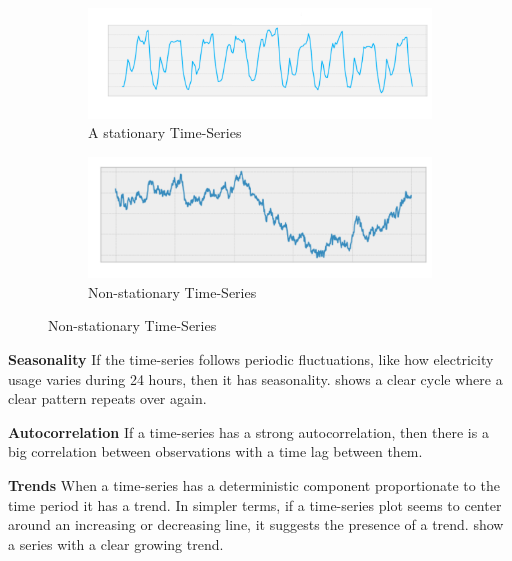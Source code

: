\begin{figure}[h!]
  \centering
  \caption{Examples of stationarity}
  \label{fig:time-series-examples-stationary-and-non-stationary}
  \begin{subfigure}[b]{0.4\textwidth}
    \includegraphics[width=\textwidth]{./figs/illustrations/time-series_example_stationary.png}
    \hfill
    \caption{A stationary Time-Series}
    \label{fig:stationary-time-series}
  \end{subfigure}
  \begin{subfigure}[b]{0.4\textwidth}
    \includegraphics[width=\textwidth]{./figs/illustrations/time-series_example_non-stationary.png}
    \hfill
    \caption{Non-stationary Time-Series}
    \label{fig:non-stationary-time-series}
  \end{subfigure}
\end{figure}

\textbf{Seasonality}
If the time-series follows periodic fluctuations, like how electricity usage varies during 24 hours,
then it has seasonality.  shows a clear cycle where
a clear pattern repeats over again.

\textbf{Autocorrelation}
If a time-series has a strong autocorrelation, then there is a big
correlation between observations with a time lag between them.

\textbf{Trends}
When a time-series has a deterministic component proportionate to the time period it has a trend.
In simpler terms, if a time-series plot seems to center around an increasing or decreasing line, it suggests the presence of a trend.
 show a series with a clear growing trend.

